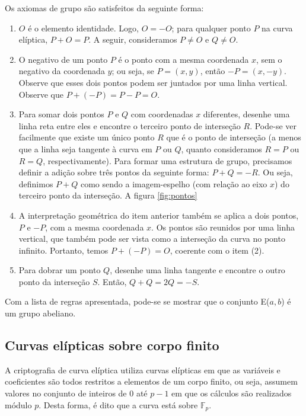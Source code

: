 Os axiomas de grupo são satisfeitos da seguinte forma:
\begin{enumerate}
  \item $O$ é o elemento identidade. Logo, $O = -O$; para qualquer ponto $P$ na curva elíptica, $P + O = P$. A seguir, consideramos $P \neq O$ e $Q \neq O$.
  \item O negativo de um ponto \(P\) é o ponto com a mesma coordenada \(x\), sem o negativo da coordenada \(y\); ou seja, se $P = (x, y)$, então $-P = (x, -y)$. Observe que esses dois pontos podem ser juntados por uma linha vertical. Observe que $P + (-P) = P - P = O$.
  \item Para somar dois pontos \(P\) e \(Q\) com coordenadas \(x\) diferentes, desenhe uma linha reta entre eles e encontre o terceiro ponto de interseção \(R\). Pode-se ver facilmente que existe um único ponto \(R\) que é o ponto de interseção (a menos que a linha seja tangente à curva em \(P\) ou \(Q\), quanto consideramos $R=P$ ou $R=Q$, respectivamente). Para formar uma estrutura de grupo, precisamos definir a adição sobre três pontos da seguinte forma: $P+Q=-R$. Ou seja, definimos $P+Q$ como sendo a imagem-espelho (com relação ao eixo \(x\)) do terceiro ponto da interseção. A figura \ref{fig:pontos}
  \item A interpretação geométrica do item anterior também se aplica a dois pontos, \(P\) e \(-P\), com a mesma coordenada \(x\). Os pontos são reunidos por uma linha vertical, que também pode ser vista como a interseção da curva no ponto infinito. Portanto, temos $P+(-P)=O$, coerente com o item (2).
  \item Para dobrar um ponto \(Q\), desenhe uma linha tangente e encontre o outro ponto da interseção \(S\). Então, $Q+Q=2Q=-S$.
\end{enumerate}

Com a lista de regras apresentada, pode-se se mostrar que o conjunto E(\(a, b\)) é um grupo abeliano. \cite{Stallings:2011}

\subsection{Curvas elípticas sobre corpo finito}
A criptografia de curva elíptica utiliza curvas elípticas em que as variáveis e coeficientes são todos restritos a elementos de um corpo finito, ou seja, assumem valores no conjunto de inteiros de 0 até $p - 1$ em que os cálculos são realizados módulo \(p\). Desta forma, é dito que a curva está sobre $\mathbb{F}_p$. \cite{Stallings:2011}

